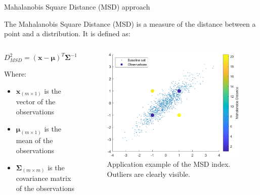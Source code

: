 \begin{frame}{Mahalanobis Square Distance (MSD) approach}

    The Mahalanobis Square Distance (MSD) is a measure of the distance between a point and a distribution. It is defined as:


    \begin{columns}[c, onlytextwidth]

        \begin{column}{0.5\textwidth}

            \begin{equation}
                D_{MSD}^2 = (\mathbf{x} - \mathbf{\mu})^T \mathbf{\Sigma}^{-1} (\mathbf{x} - \mathbf{\mu})
            \end{equation}

            Where:
            \begin{itemize}
                \item $\mathbf{x}_{(m \times 1)}$ is the vector of the observations
                \item $\mathbf{\mu}_{(m \times 1)}$ is the mean of the observations
                \item $\mathbf{\Sigma}_{(m \times m)}$ is the covariance matrix of the observations
            \end{itemize}

        \end{column}

        \hfill

        \begin{column}{0.45\textwidth}

            \begin{figure}[H]
                \centering
                \includegraphics[width=\textwidth]{img/Mahalanobis-cloud-plot.png}
                \caption{Application example of the MSD index. \textcolor[HTML]{F5EC22}{Outliers} are clearly visible.}
            \end{figure}


\end{column}
\end{columns}
\end{frame}
